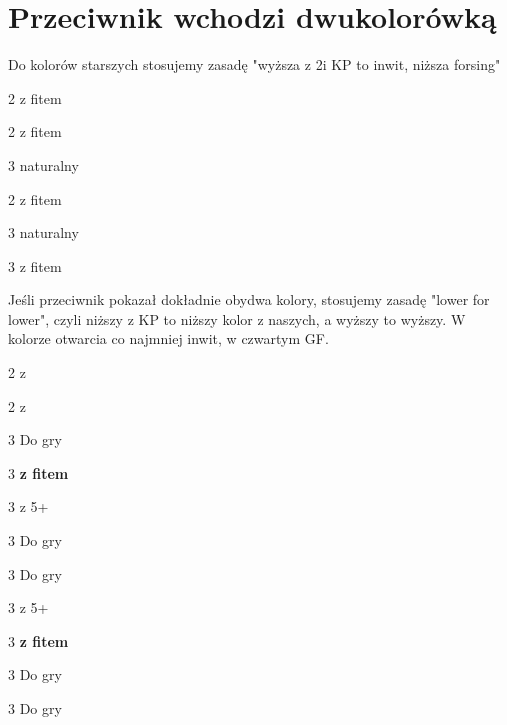\documentclass[12pt, a4paper]{article}
\begin{document}
\pagebreak
\section*{Przeciwnik wchodzi dwukolorówką}


Do kolorów starszych stosujemy zasadę "wyższa z 2\nt i KP to inwit, niższa forsing"
\compsequence{{1\hearts}{2\hearts}}
\begin{compoptions}[3]
    \item[2\spades] \gf z fitem \hearts \imp
    \item[2\nt] \inv z fitem \hearts \imp
    \item[3\minor] \gf naturalny
\end{compoptions}

\compsequence{{1\spades}{2\spades}}
\begin{compoptions}[3]
    \item[2\nt] \gf z fitem \spades \imp
    \item[3\minor] \gf naturalny
    \item[3\hearts] \inv z fitem \spades \imp
\end{compoptions}
\vspace{1cm}

Jeśli przeciwnik pokazał dokładnie obydwa kolory, stosujemy zasadę "lower for lower",
czyli niższy z KP to niższy kolor z naszych, a wyższy to wyższy.
W kolorze otwarcia co najmniej inwit, w czwartym GF.
\compsequence{{1\clubs}{2\diams}}
\begin{compoptions}[3]
    \item[2\hearts] \invp z \clubs
    \item[2\spades] \gf z \diams  
    \item[3\minor] Do gry  
\end{compoptions}

\begin{compoptions}[3]
    \item[3\clubs] \invp \textbf{z fitem} \hearts \vimp
    \item[3\diams] \gf z 5+\spades \imp
    \item[3\hearts] Do gry
    \item[3\spades] Do gry   
\end{compoptions}

\begin{compoptions}[3]
    \item[3\clubs] \gf z 5+\hearts \imp
    \item[3\diams] \invp \textbf{z fitem} \spades \vimp
    \item[3\hearts] Do gry
    \item[3\spades] Do gry   
\end{compoptions}
\end{document}
